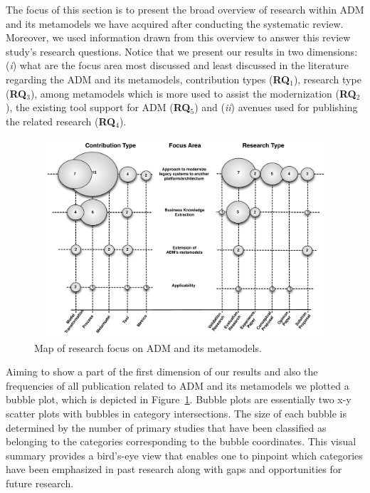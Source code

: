 

The focus of this section is to present the broad overview of research within ADM and its metamodels we have acquired after conducting the systematic review. Moreover, we used information drawn from this overview to answer this review study's research questions. Notice that we present our results in two dimensions: (\textit{i}) what are the focus area most discussed and least discussed in the literature regarding the ADM and its metamodels, contribution types (\textbf{RQ$_1$}), research type (\textbf{RQ$_3$}), among metamodels which is more used to assist the modernization (\textbf{RQ$_2$}), the existing tool support for ADM (\textbf{RQ$_5$}) and (\textit{ii}) avenues used for publishing the related research (\textbf{RQ$_4$}).

\begin{figure}[t]
\centering
  \includegraphics[width=17.5cm, height=7.4cm]{figuras/MapaNOVO3}
\caption{Map of research focus on ADM and its metamodels.}
\label{map}
\end{figure} 




Aiming to show a part of the first dimension of our results and also the frequencies of all publication related to ADM and its metamodels we plotted a bubble plot, which is depicted in Figure~\ref{map}. Bubble plots are essentially two x-y scatter plots with bubbles in category intersections. The size of each bubble is determined by the number of primary studies that have been classified as belonging to the categories corresponding to the bubble coordinates. This visual summary provides a bird's-eye view that enables one to pinpoint which categories have been emphasized in past research along with gaps and opportunities for future research.

